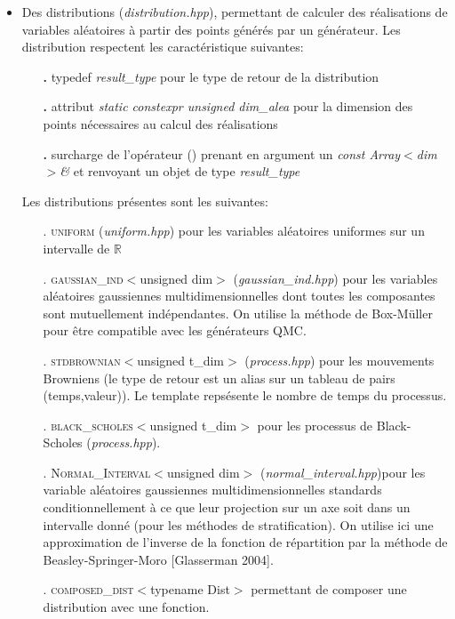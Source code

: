 \documentclass[12pt,a4paper]{report}
\newcommand{\R}{\mathbb{R}}
\newcommand{\source}[1]{\emph{#1}}
\newcommand{\class}[1]{\textsc{#1}}
\begin{document}
\begin{itemize}
	\item Des distributions (\source{distribution.hpp}), permettant de calculer des réalisations de variables aléatoires à partir des points générés par un générateur. Les distribution respectent les caractéristique suivantes:
	\begin{itemize}
		\item[\Huge\textbf{.}] typedef \textit{result\_type} pour le type de retour de la distribution
		\item[\Huge\textbf{.}] attribut \textit{static constexpr unsigned dim\_alea} pour la dimension des points nécessaires au calcul des réalisations
		\item[\Huge\textbf{.}] surcharge de l'opérateur () prenant en argument un \textit{const Array$<$dim$>$\&} et renvoyant un objet de type \textit{result\_type}\\
	\end{itemize}
	
	Les distributions présentes sont les suivantes:
	\begin{itemize}
		\item[.] \class{uniform} (\source{uniform.hpp}) pour les variables aléatoires uniformes sur un intervalle de $\R$
		\item[.] \class{gaussian\_ind}$<$unsigned dim$>$ (\source{gaussian\_ind.hpp}) pour les variables aléatoires gaussiennes multidimensionnelles dont toutes les composantes sont mutuellement indépendantes. On utilise la méthode de Box-Müller pour être compatible avec les générateurs QMC.
		\item[.] \class{stdbrownian}$<$unsigned t\_dim$>$ (\source{process.hpp}) pour les mouvements Browniens (le type de retour est un alias sur un tableau de pairs (temps,valeur)). Le template repsésente le nombre de temps du processus.
		\item[.] \class{black\_scholes}$<$unsigned t\_dim$>$ pour les processus de Black-Scholes (\source{process.hpp}).
		\item[.] \class{Normal\_Interval}$<$unsigned dim$>$ (\source{normal\_interval.hpp})pour les variable aléatoires gaussiennes multidimensionnelles standards conditionnellement à ce que leur projection sur un axe soit dans un intervalle donné (pour les méthodes de stratification). On utilise ici une approximation de l'inverse de la fonction de répartition par la méthode de Beasley-Springer-Moro [Glasserman 2004].
		\item[.] \class{composed\_dist}$<$typename Dist$>$ permettant de composer une distribution avec une fonction.\\
	\end{itemize}
	

\end{itemize}
\end{document}
